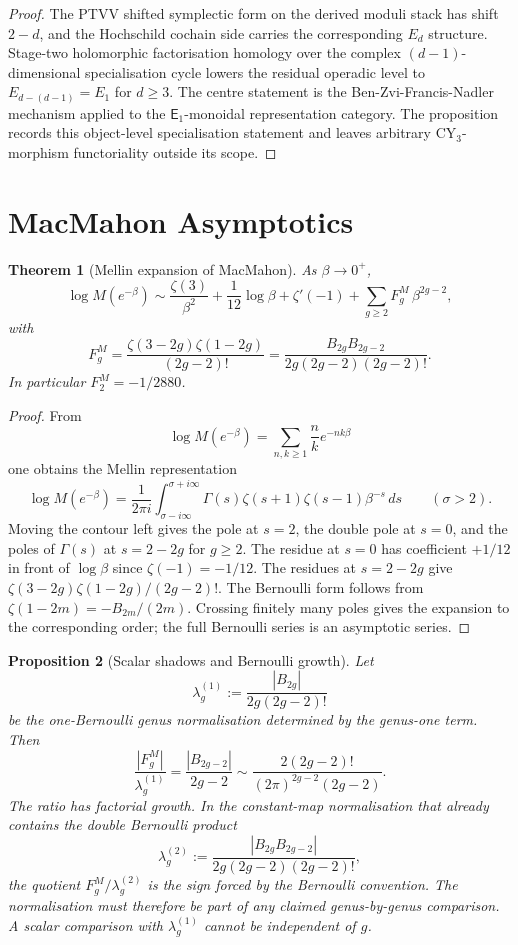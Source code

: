 \documentclass[11pt]{article}
\newtheorem{theorem}{Theorem}[section]
\newtheorem{proposition}[theorem]{Proposition}
\theoremstyle{definition}
\theoremstyle{remark}
\newcommand{\Eone}{\mathsf{E}_{1}}
\newcommand{\Mac}{M}
\newcommand{\Bnum}[1]{B_{#1}}
\begin{document}
\begin{proof}
The PTVV shifted symplectic form on the derived moduli stack has shift
$2-d$, and the Hochschild cochain side carries the corresponding
$E_d$ structure. Stage-two holomorphic factorisation homology over the
complex $(d-1)$-dimensional specialisation cycle lowers the residual
operadic level to $E_{d-(d-1)}=E_1$ for $d\geq3$. The centre statement
is the Ben-Zvi-Francis-Nadler mechanism applied to the
$\Eone$-monoidal representation category. The proposition records this
object-level specialisation statement and leaves arbitrary
CY$_3$-morphism functoriality outside its scope.
\end{proof}

\section{MacMahon Asymptotics}
\label{sec:macmahon-asymptotics}

\begin{theorem}[Mellin expansion of MacMahon]
\label{thm:macmahon-mellin}
As $\beta\to0^+$,
\[
  \log \Mac(e^{-\beta})
  \sim
  \frac{\zeta(3)}{\beta^2}
  +\frac{1}{12}\log\beta
  +\zeta'(-1)
  +\sum_{g\geq2}F_g^{\Mac}\,\beta^{2g-2},
\]
with
\[
  F_g^{\Mac}
  =
  \frac{\zeta(3-2g)\zeta(1-2g)}{(2g-2)!}
  =
  \frac{\Bnum{2g}\Bnum{2g-2}}
       {2g(2g-2)(2g-2)!}.
\]
In particular $F_2^{\Mac}=-1/2880$.
\end{theorem}

\begin{proof}
From
\[
  \log \Mac(e^{-\beta})
  =
  \sum_{n,k\geq1}\frac{n}{k}e^{-nk\beta}
\]
one obtains the Mellin representation
\[
  \log \Mac(e^{-\beta})
  =
  \frac{1}{2\pi i}\int_{\sigma-i\infty}^{\sigma+i\infty}
  \Gamma(s)\zeta(s+1)\zeta(s-1)\beta^{-s}\,ds
  \qquad(\sigma>2).
\]
Moving the contour left gives the pole at $s=2$, the double pole at
$s=0$, and the poles of $\Gamma(s)$ at $s=2-2g$ for $g\geq2$. The
residue at $s=0$ has coefficient $+1/12$ in front of $\log\beta$ since
$\zeta(-1)=-1/12$. The residues at $s=2-2g$ give
$\zeta(3-2g)\zeta(1-2g)/(2g-2)!$. The Bernoulli form follows from
$\zeta(1-2m)=-B_{2m}/(2m)$. Crossing finitely many poles gives the
expansion to the corresponding order; the full Bernoulli series is an
asymptotic series.
\end{proof}

\begin{proposition}[Scalar shadows and Bernoulli growth]
\label{prop:scalar-shadow-growth}
Let
\[
  \lambda_g^{(1)}
  :=
  \frac{|\Bnum{2g}|}{2g(2g-2)!}
\]
be the one-Bernoulli genus normalisation determined by the genus-one
term. Then
\[
  \frac{|F_g^{\Mac}|}{\lambda_g^{(1)}}
  =
  \frac{|\Bnum{2g-2}|}{2g-2}
  \sim
  \frac{2(2g-2)!}{(2\pi)^{2g-2}(2g-2)}.
\]
The ratio has factorial growth. In the constant-map normalisation that
already contains the double Bernoulli product
\[
  \lambda_g^{(2)}
  :=
  \frac{|\Bnum{2g}\Bnum{2g-2}|}
       {2g(2g-2)(2g-2)!},
\]
the quotient $F_g^{\Mac}/\lambda_g^{(2)}$ is the sign forced by the
Bernoulli convention. The normalisation must therefore be part of any
claimed genus-by-genus comparison. A scalar comparison with
$\lambda_g^{(1)}$ cannot be independent of $g$.
\end{proposition}
\end{document}
